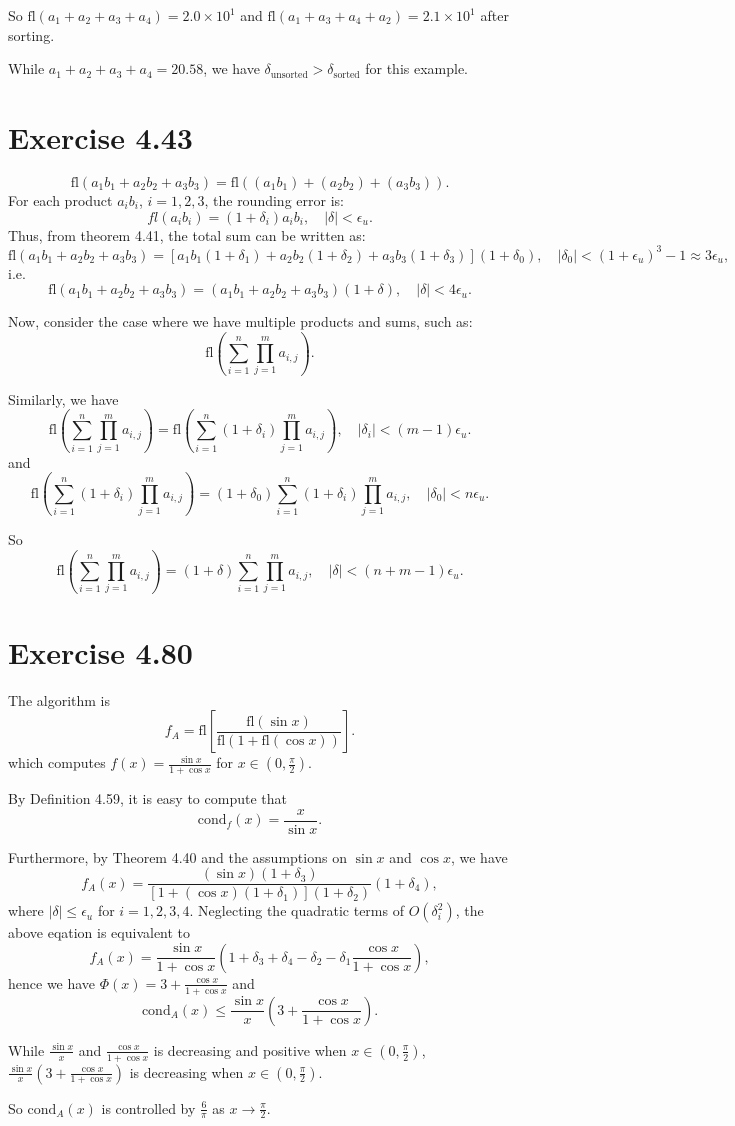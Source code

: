 \documentclass[a4paper]{article}
\begin{document}
So $\text{fl}(a_1+a_2+a_3+a_4)=2.0\times 10^1$ and $\text{fl}(a_1+a_3+a_4+a_2)=2.1\times 10^1$ after sorting.

While $a_1+a_2+a_3+a_4=20.58$, we have $\delta_{\text{unsorted}}> \delta_{\text{sorted}}$ for this example.


\section*{Exercise 4.43}
\[
\text{fl}(a_1b_1 + a_2b_2 + a_3b_3) = \text{fl}\left( (a_1b_1) + (a_2b_2) + (a_3b_3) \right).
\]
For each product \( a_ib_i \), $i=1,2,3$, the rounding error is:
\[
fl(a_ib_i)=(1+\delta_i)a_i b_i, \quad |\delta|<\epsilon_u.
\]
Thus, from theorem 4.41, the total sum can be written as:
\[
\text{fl}(a_1b_1 + a_2b_2 + a_3b_3) = [a_1b_1(1+\delta_1) + a_2b_2(1+\delta_2) + a_3b_3(1+\delta_3)](1+\delta_0), \quad |\delta_0|<(1+\epsilon_u)^3-1\approx 3 \epsilon_u,
\]
i.e. 
$$
\text{fl}(a_1b_1 + a_2b_2 + a_3b_3)=(a_1b_1 + a_2b_2 + a_3b_3)(1+\delta), \quad |\delta|< 4\epsilon_u.
$$

Now, consider the case where we have multiple products and sums, such as:
\[
\text{fl}\left( \sum_{i=1}^{n} \prod_{j=1}^{m} a_{i,j} \right).
\]

Similarly, we have
$$
\text{fl}\left( \sum_{i=1}^{n} \prod_{j=1}^{m} a_{i,j} \right)=\text{fl}\left( \sum_{i=1}^{n}(1+\delta_i) \prod_{j=1}^{m} a_{i,j} \right), \quad |\delta_i|<(m-1)\epsilon_u.
$$
and
$$
\text{fl}\left( \sum_{i=1}^{n}(1+\delta_i) \prod_{j=1}^{m} a_{i,j} \right)=(1+\delta_0)\sum_{i=1}^{n} (1+\delta_i)\prod_{j=1}^{m} a_{i,j}, \quad |\delta_0|<n\epsilon_u.
$$

So 
$$
\text{fl}\left( \sum_{i=1}^{n} \prod_{j=1}^{m} a_{i,j} \right)=(1+\delta)\sum_{i=1}^{n} \prod_{j=1}^{m} a_{i,j}, \quad |\delta|<(n+m-1)\epsilon_u.
$$

\section*{Exercise 4.80}
The algorithm is 
$$
f_A=\text{fl}\left[\dfrac{\text{fl}(\sin x)}{\text{fl}(1+\text{fl}(\cos x))}\right].
$$
which computes $f(x)=\frac{\sin x}{1+\cos x}$ for $x\in(0,\frac{\pi}{2})$.

By Definition 4.59, it is easy to compute that 
$$
\text{cond}_f(x)=\frac{x}{\sin x}.
$$

Furthermore, by Theorem 4.40 and the assumptions on $\sin x$ and $\cos x$, we have
$$
f_A(x)=\frac{(\sin x)(1+\delta_3)}{[1+(\cos x)(1+\delta_1)](1+\delta_2)}(1+\delta_4),
$$
where $|\delta| \leq \epsilon_u$ for $i=1,2,3,4$. Neglecting the quadratic terms of $O(\delta ^2_i)$, the above eqation is equivalent to 
$$
f_A(x)=\frac{\sin x}{1+\cos x}(1+\delta_3+\delta_4-\delta_2-\delta_1\frac{\cos x}{1+\cos x}),
$$
hence we have $\Phi(x)=3+\frac{\cos x}{1+\cos x}$ and 
$$
\text{cond}_A(x)\leq \frac{\sin x}{x}(3+\frac{\cos x}{1+\cos x}).
$$

While $\frac{\sin x}{x}$ and $\frac{\cos x}{1+\cos x}$ is decreasing and positive when $x\in(0,\frac{\pi}{2})$, $\frac{\sin x}{x}(3+\frac{\cos x}{1+\cos x})$ is decreasing when $x\in(0,\frac{\pi}{2})$.

So $\text{cond}_A(x)$ is controlled by $\frac{6}{\pi}$ as $x\rightarrow \frac{\pi}{2}$.
\end{document}
